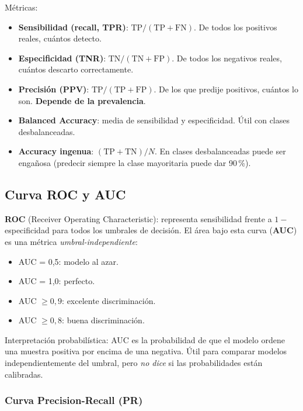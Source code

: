 \documentclass[11pt, a4paper]{article}
\begin{document}
M\'etricas:

\begin{itemize}[leftmargin=1.2em]
  \item \textbf{Sensibilidad (recall, TPR)}: $\text{TP} / (\text{TP} + \text{FN})$.
  De todos los positivos reales, cu\'antos detecto.
  \item \textbf{Especificidad (TNR)}: $\text{TN} / (\text{TN} + \text{FP})$.
  De todos los negativos reales, cu\'antos descarto correctamente.
  \item \textbf{Precisi\'on (PPV)}: $\text{TP} / (\text{TP} + \text{FP})$.
  De los que predije positivos, cu\'antos lo son. \textbf{Depende de la
  prevalencia}.
  \item \textbf{Balanced Accuracy}: media de sensibilidad y especificidad.
  \'Util con clases desbalanceadas.
  \item \textbf{Accuracy ingenua}: $(\text{TP}+\text{TN})/N$. En clases
  desbalanceadas puede ser enga\~nosa (predecir siempre la clase
  mayoritaria puede dar 90\,\%).
\end{itemize}

\subsection{Curva ROC y AUC}

\textbf{ROC} (Receiver Operating Characteristic): representa sensibilidad
frente a $1-$especificidad para todos los umbrales de decisi\'on. El
\'area bajo esta curva (\textbf{AUC}) es una m\'etrica \emph{umbral-independiente}:

\begin{itemize}[leftmargin=1.2em]
  \item AUC = 0,5: modelo al azar.
  \item AUC = 1,0: perfecto.
  \item AUC $\geq 0{,}9$: excelente discriminaci\'on.
  \item AUC $\geq 0{,}8$: buena discriminaci\'on.
\end{itemize}

Interpretaci\'on probabil\'istica: AUC es la probabilidad de que el
modelo ordene una muestra positiva por encima de una negativa. \'Util
para comparar modelos independientemente del umbral, pero \emph{no dice}
si las probabilidades est\'an calibradas.

\subsubsection*{Curva Precision-Recall (PR)}
\end{document}

